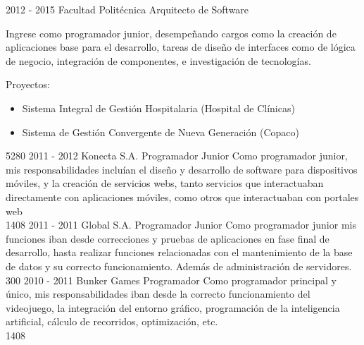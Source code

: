 \documentclass[]{friggeri-cv}
\begin{document}
\begin{entrylist}
{	}
    {}


\entry
    {2012 - 2015}
    {Facultad Politécnica}
    {Arquitecto de Software}
    {Ingrese como programador junior, desempeñando cargos como la creación de
        aplicaciones base para el desarrollo, tareas de diseño de interfaces
        como de lógica de negocio, integración de componentes, e investigación
        de tecnologías.

        Proyectos:
        \begin{itemize}
            \item Sistema Integral de Gestión Hospitalaria (Hospital de
                Clínicas)
            \item Sistema de Gestión Convergente de Nueva Generación (Copaco)
        \end{itemize}}
    {5280}
\entry
    {2011 - 2012}
    {Konecta S.A.}
    {Programador Junior}
    {Como programador junior, mis responsabilidades incluían el diseño y
        desarrollo de software para dispositivos móviles, y la creación de
        servicios webs, tanto servicios que interactuaban directamente con
        aplicaciones móviles, como otros que interactuaban con portales web
        \\}
    {1408}
\entry
    {2011 - 2011}
    {Global S.A.}
    {Programador Junior}
    {Como programador junior mis funciones iban desde correcciones y pruebas de
        aplicaciones en fase final de desarrollo, hasta realizar funciones
        relacionadas con el mantenimiento de la base de datos y su correcto
        funcionamiento. Además de administración de servidores. \\}
    {300}
\entry
    {2010 - 2011}
    {Bunker Games}
    {Programador}
    {Como programador principal y único, mis responsabilidades iban desde la
        correcto funcionamiento del videojuego, la integración del entorno
        gráfico, programación de la inteligencia artificial, cálculo de
        recorridos, optimización, etc. \\}
    {1408}

\end{entrylist}
\end{document}
